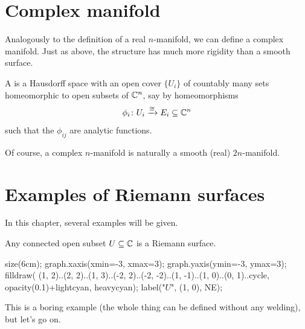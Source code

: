 \section{Complex manifold}
Analogously to the definition of a real $n$-manifold, we can define a complex manifold.
Just as above, the structure has much more rigidity than a smooth surface.

\begin{definition}
	A  is a Hausdorff space with an open cover $\{ U_i \}$ of countably
	many sets homeomorphic to open subsets of $\mathbb C^n$, say by homeomorphisms
	\[ \phi_i \colon U_i \xrightarrow{\cong} E_i \subseteq \mathbb C^n \]
	such that the  $\phi_{ij}$ are analytic functions.
\end{definition}
Of course, a complex $n$-manifold is naturally a smooth (real) $2n$-manifold.

\section{Examples of Riemann surfaces}

In this chapter, several examples will be given.
\begin{example}
	Any connected open subset $U \subseteq \mathbb C$ is a Riemann surface.
	\begin{center}
		\begin{asy}
			size(6cm);
			graph.xaxis(xmin=-3, xmax=3);
			graph.yaxis(ymin=-3, ymax=3);
			filldraw(
				(1, 2)..(2, 2)..(1, 3)..(-2, 2)..(-2, -2)..(1, -1)..(1, 0)..(0, 1)..cycle,
				opacity(0.1)+lightcyan, heavycyan);
			label("$U$", (1, 0), NE);
		\end{asy}
	\end{center}

	This is a boring example (the whole thing can be defined without any welding), but let's go on.
\end{example}

